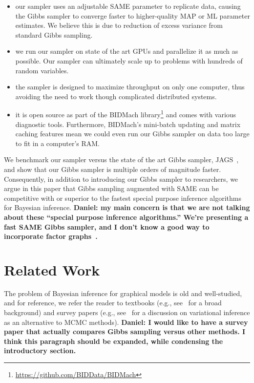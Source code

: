 \documentclass{article} %
\begin{document}
\begin{itemize}[noitemsep]
    \item our sampler uses an adjustable SAME parameter to replicate data, causing the Gibbs sampler
    to converge faster to higher-quality MAP or ML parameter estimates. We believe this is due to
    reduction of excess variance from standard Gibbs sampling.
    \item we run our sampler on state of the art GPUs and parallelize it as much as possible. Our
    sampler can ultimately scale up to problems with hundreds of random variables.
    \item the sampler is designed to maximize throughput on only one computer, thus avoiding the
    need to work though complicated distributed systems.
    \item it is open source as part of the BIDMach
    library\footnote{\url{https://github.com/BIDData/BIDMach}} and comes with various diagnostic
    tools. Furthermore, BIDMach's mini-batch updating and matrix caching features mean we could even
    run our Gibbs sampler on data too large to fit in a computer's RAM.
\end{itemize}

We benchmark our sampler versus the state of the art Gibbs sampler, JAGS~\citep{JAGS2003}, and show
that our Gibbs sampler is multiple orders of magnitude faster. Consequently, in addition to
introducing our Gibbs sampler to researchers, we argue in this paper that Gibbs sampling augmented
with SAME can be competitive with or superior to the fastest special purpose inference algorithms
for Bayesian inference. \textbf{Daniel: my main concern is that we are not talking about these
``special purpose inference algorithms.'' We're presenting a fast SAME Gibbs sampler, and I don't
know a good way to incorporate factor graphs~\citep{Factorie2009}.}





\section{Related Work}\label{sec:related_work}

The problem of Bayesian inference for graphical models is old and well-studied, and for reference,
we refer the reader to textbooks (e.g., see~\citet{Koller2009} for a broad background) and survey
papers (e.g., see~\citet{Wainwright2008} for a discussion on variational inference as an alternative
to MCMC methods). \textbf{Daniel: I would like to have a survey paper that actually compares Gibbs
sampling versus other methods. I think this paragraph should be expanded, while condensing the
introductory section.}
\end{document}
